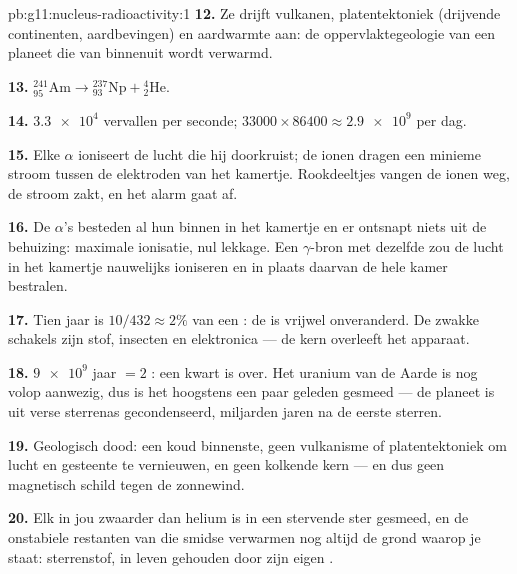 \begin{solution}{pb:g11:nucleus-radioactivity:1}
\textbf{12.} Ze drijft vulkanen, platentektoniek (drijvende continenten,
aardbevingen) en aardwarmte aan: de oppervlaktegeologie van een planeet
die van binnenuit wordt verwarmd.

\textbf{13.} ${}^{241}_{95}\mathrm{Am} \to {}^{237}_{93}\mathrm{Np} +
{}^{4}_{2}\mathrm{He}$.

\textbf{14.} $\num{3.3e4}$ vervallen per seconde;
$\num{33000} \times 86400 \approx \num{2.9e9}$ per dag.

\textbf{15.} Elke $\alpha$ ioniseert de lucht die hij doorkruist; de ionen
dragen een minieme stroom tussen de elektroden van het kamertje.
Rookdeeltjes vangen de ionen weg, de stroom zakt, en het alarm gaat af.

\textbf{16.} De $\alpha$'s besteden al hun  binnen in het kamertje
en er ontsnapt niets uit de behuizing: maximale ionisatie, nul lekkage.
Een $\gamma$-bron met dezelfde  zou de lucht in het kamertje
nauwelijks ioniseren en in plaats daarvan de hele kamer bestralen.

\textbf{17.} Tien jaar is $10/432 \approx 2\%$ van een : de
 is vrijwel onveranderd. De zwakke schakels zijn stof, insecten
en elektronica --- de kern overleeft het apparaat.

\textbf{18.} $\num{9e9}$ jaar $= 2$ : een kwart is over.
Het uranium van de Aarde is nog volop aanwezig, dus is het hoogstens een
paar  geleden gesmeed --- de planeet is uit verse
sterrenas gecondenseerd, miljarden jaren na de eerste sterren.

\textbf{19.} Geologisch dood: een koud binnenste, geen vulkanisme of
platentektoniek om lucht en gesteente te vernieuwen, en geen kolkende
kern --- en dus geen magnetisch schild tegen de zonnewind.

\textbf{20.} Elk  in jou zwaarder dan helium is in een stervende ster
gesmeed, en de onstabiele restanten van die smidse verwarmen nog altijd de
grond waarop je staat: sterrenstof, in leven gehouden door zijn eigen
.
\end{solution}
